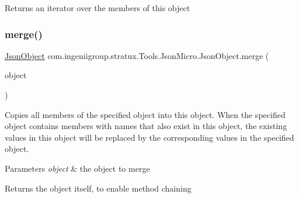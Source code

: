 \begin{DoxyReturn}{Returns}
an iterator over the members of this object 
\end{DoxyReturn}
\mbox{\label{classcom_1_1ingeniigroup_1_1stratux_1_1_tools_1_1_json_micro_1_1_json_object_a33e4862b982124e6dd4d62d179b0f1f1}} 
\subsubsection{\texorpdfstring{merge()}{merge()}}
{\footnotesize\ttfamily \hyperlink{classcom_1_1ingeniigroup_1_1stratux_1_1_tools_1_1_json_micro_1_1_json_object}{Json\+Object} com.\+ingeniigroup.\+stratux.\+Tools.\+Json\+Micro.\+Json\+Object.\+merge (\begin{DoxyParamCaption}\item[{\hyperlink{classcom_1_1ingeniigroup_1_1stratux_1_1_tools_1_1_json_micro_1_1_json_object}{Json\+Object}}]{object }\end{DoxyParamCaption})}

Copies all members of the specified object into this object. When the specified object contains members with names that also exist in this object, the existing values in this object will be replaced by the corresponding values in the specified object.


\begin{DoxyParams}{Parameters}
{\em object} & the object to merge \\
\hline
\end{DoxyParams}
\begin{DoxyReturn}{Returns}
the object itself, to enable method chaining 
\end{DoxyReturn}
\mbox{\label{classcom_1_1ingeniigroup_1_1stratux_1_1_tools_1_1_json_micro_1_1_json_object_a70753ed3f8f6c138e16acf76874aff52}} 
